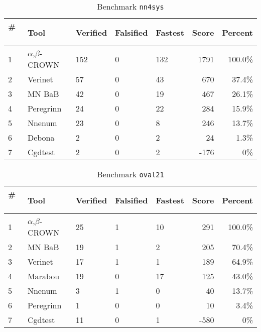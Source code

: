 
\begin{table}[h]
\begin{center}
\caption{Benchmark \texttt{nn4sys}} \label{tab:cat_{cat}}
{\setlength{\tabcolsep}{2pt}
\begin{tabular}[h]{@{}lllllrr@{}}
\toprule
\textbf{\# ~} & \textbf{Tool} & \textbf{Verified} & \textbf{Falsified} & \textbf{Fastest} & \textbf{Score} & \textbf{Percent}\\
\midrule
1 & $\alpha$,$\beta$-CROWN & 152 & 0 & 132 & 1791 & 100.0\% \\
2 & Verinet & 57 & 0 & 43 & 670 & 37.4\% \\
3 & MN BaB & 42 & 0 & 19 & 467 & 26.1\% \\
4 & Peregrinn & 24 & 0 & 22 & 284 & 15.9\% \\
5 & Nnenum & 23 & 0 & 8 & 246 & 13.7\% \\
6 & Debona & 2 & 0 & 2 & 24 & 1.3\% \\
7 & Cgdtest & 2 & 0 & 2 & -176 & 0\% \\
\bottomrule
\end{tabular}
}
\end{center}
\end{table}




\begin{table}[h]
\begin{center}
\caption{Benchmark \texttt{oval21}} \label{tab:cat_{cat}}
{\setlength{\tabcolsep}{2pt}
\begin{tabular}[h]{@{}lllllrr@{}}
\toprule
\textbf{\# ~} & \textbf{Tool} & \textbf{Verified} & \textbf{Falsified} & \textbf{Fastest} & \textbf{Score} & \textbf{Percent}\\
\midrule
1 & $\alpha$,$\beta$-CROWN & 25 & 1 & 10 & 291 & 100.0\% \\
2 & MN BaB & 19 & 1 & 2 & 205 & 70.4\% \\
3 & Verinet & 17 & 1 & 1 & 189 & 64.9\% \\
4 & Marabou & 19 & 0 & 17 & 125 & 43.0\% \\
5 & Nnenum & 3 & 1 & 0 & 40 & 13.7\% \\
6 & Peregrinn & 1 & 0 & 0 & 10 & 3.4\% \\
7 & Cgdtest & 11 & 0 & 1 & -580 & 0\% \\
\bottomrule
\end{tabular}
}
\end{center}
\end{table}



